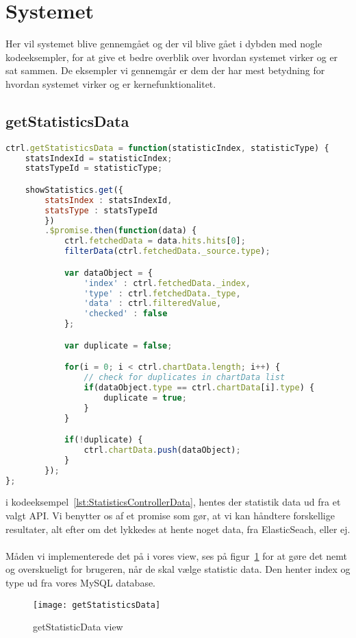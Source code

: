 \section{Systemet}
Her vil systemet blive gennemgået og der vil blive gået i dybden med nogle kodeeksempler, for at give et bedre overblik over hvordan systemet virker og er sat sammen.
De eksempler vi gennemgår er dem der har mest betydning for hvordan systemet virker og er kernefunktionalitet.
\subsection{getStatisticsData}
\begin{lstlisting}[caption={getStatisticsData}, language={JavaScript}, label={lst:StatisticsControllerData}]
ctrl.getStatisticsData = function(statisticIndex, statisticType) {
    statsIndexId = statisticIndex;
    statsTypeId = statisticType;

    showStatistics.get({
        statsIndex : statsIndexId,
        statsType : statsTypeId
        })
        .$promise.then(function(data) {
            ctrl.fetchedData = data.hits.hits[0];
            filterData(ctrl.fetchedData._source.type);

            var dataObject = {
                'index' : ctrl.fetchedData._index,
                'type' : ctrl.fetchedData._type,
                'data' : ctrl.filteredValue,
                'checked' : false
            };

            var duplicate = false;

            for(i = 0; i < ctrl.chartData.length; i++) {
                // check for duplicates in chartData list
                if(dataObject.type == ctrl.chartData[i].type) {
                    duplicate = true;
                }
            }

            if(!duplicate) {
                ctrl.chartData.push(dataObject);
            }
        });
};
\end{lstlisting}
i kodeeksempel~\ref{lst:StatisticsControllerData}, hentes der statistik data ud fra et valgt API.
Vi benytter os af et promise som gør, at vi kan håndtere forskellige resultater, alt efter om det lykkedes at hente noget data, fra ElasticSeach, eller ej.
\\\\
Måden vi implementerede det på i vores view, ses på figur~\ref{fig:getStatisticsData} for at gøre det nemt og overskueligt for brugeren,
når de skal vælge statistic data.
Den henter index og type ud fra vores MySQL database.
\begin{figure}[H]
\texttt{[image: getStatisticsData]}
\caption{getStatisticData view}
\label{fig:getStatisticsData}
\end{figure}
